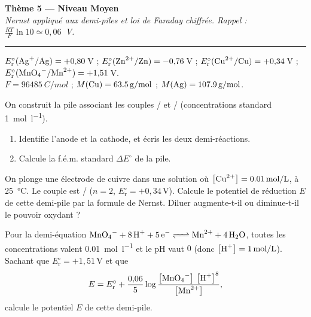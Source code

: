 \documentclass[11pt,a4paper]{article}
\newcommand{\Ered}{\ensuremath{E_{\mathrm{r}}^{\circ}}}
\newcommand{\fem}{\ensuremath{\Delta E}}
\newcommand{\cc}[1]{\left[#1\right]}
\newcounter{exo}
\begin{document}
\begin{center}
{\LARGE\bfseries\color{primarydark}Thème 5 — Niveau Moyen}\\[2pt]
{\small\itshape Nernst appliqué aux demi-piles et loi de Faraday chiffrée. Rappel : $\frac{RT}{F}\ln 10 \simeq 0{,}06$~V.}\\[-4pt]
{\color{primary}\rule{\textwidth}{1pt}}
\end{center}

\begin{donnees}
\centering\small
$\Ered(\ce{Ag+}/\ce{Ag})=+0{,}80$\,V ; $\Ered(\ce{Zn^{2+}}/\ce{Zn})=-0{,}76$\,V ;
$\Ered(\ce{Cu^{2+}}/\ce{Cu})=+0{,}34$\,V ; $\Ered(\ce{MnO4^-}/\ce{Mn^{2+}})=+1{,}51$\,V.\\
$F=\SI{96485}{C\per mol}$ ; $M(\ce{Cu})=\SI{63.5}{g\per mol}$ ; $M(\ce{Ag})=\SI{107.9}{g\per mol}$.
\end{donnees}

\begin{exo}
On construit la pile associant les couples / et / (concentrations
standard \SI{1}{mol\per\litre}).
\begin{enumerate}[label=(\alph*),leftmargin=2em,topsep=1pt,itemsep=1pt]
  \item Identifie l'anode et la cathode, et écris les deux demi-réactions.
  \item Calcule la f.é.m. standard $\fem^{\circ}$ de la pile.
\end{enumerate}
\end{exo}

\begin{exo}
On plonge une électrode de cuivre dans une solution où $\cc{\ce{Cu^{2+}}}=\SI{0.01}{mol\per\litre}$,
à \SI{25}{\celsius}. Le couple est / ($n=2$, $\Ered=+0{,}34$\,V). Calcule le
potentiel de réduction $E$ de cette demi-pile par la formule de Nernst. Diluer 
augmente-t-il ou diminue-t-il le pouvoir oxydant ?
\end{exo}

\begin{exo}
Pour la demi-équation $\ce{MnO4^- + 8 H+ + 5 e^- <=> Mn^{2+} + 4 H2O}$, toutes les concentrations
valent \SI{0.01}{mol\per\litre} et le pH vaut $0$ (donc $\cc{\ce{H+}}=\SI{1}{mol\per\litre}$).
Sachant que $\Ered=+1{,}51$\,V et que
\[
E = \Ered + \frac{0{,}06}{5}\log\frac{\cc{\ce{MnO4^-}}\,\cc{\ce{H+}}^{8}}{\cc{\ce{Mn^{2+}}}},
\]
calcule le potentiel $E$ de cette demi-pile.
\end{exo}
\end{document}
